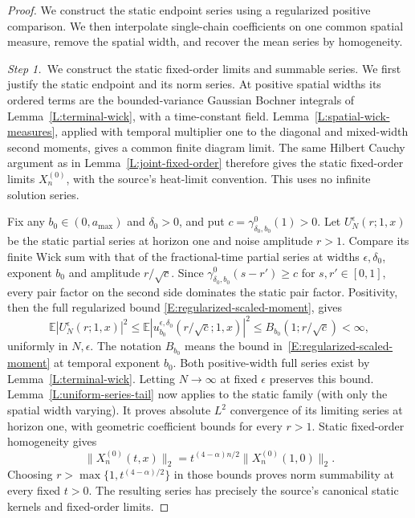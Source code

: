 \documentclass[12pt,oneside,openany]{book}
\numberwithin{equation}{section}
\theoremstyle{nogostyle}
\theoremstyle{definition}
\newcommand{\E}{\mathbb{E}}
\begin{document}
\begin{proof}
  We construct the static endpoint series using a regularized positive
  comparison. We then interpolate single-chain coefficients on one common
  spatial measure, remove the spatial width, and recover the mean series by
  homogeneity.


  \medskip
  \noindent\textit{Step 1.~}We construct the static fixed-order limits and
  summable series.
  We first justify the static endpoint and its norm series. At positive spatial
  widths its ordered terms are the bounded-variance Gaussian Bochner integrals
  of Lemma~\ref{L:terminal-wick}, with a time-constant field.
  Lemma~\ref{L:spatial-wick-measures}, applied with temporal multiplier one to
  the diagonal and mixed-width second moments, gives a common finite diagram
  limit. The same Hilbert Cauchy argument as in Lemma~\ref{L:joint-fixed-order}
  therefore gives the static fixed-order limits $X_n^{(0)}$, with the source's
  heat-limit convention. This uses no infinite solution series.

  Fix any $b_0 \in (0,a_{\max})$ and $\delta_0 > 0$, and put $c =
  \gamma_{\delta_0,b_0}^0(1) > 0$. Let $U_N^\epsilon(r;1,x)$ be the static
  partial series at horizon one and noise amplitude $r > 1$. Compare its finite
  Wick sum with that of the fractional-time partial series at widths
  $\epsilon,\delta_0$, exponent $b_0$ and amplitude $r/\sqrt c$. Since
  $\gamma_{\delta_0,b_0}^0(s-r') \ge c$ for $s,r' \in [0,1]$, every pair factor
  on the second side dominates the static pair factor. Positivity, then the full
  regularized bound \eqref{E:regularized-scaled-moment}, gives
  \[
    \E|U_N^\epsilon(r;1,x)|^2
    \le \E|u^{\epsilon,\delta_0}_{b_0}(r/\sqrt c;1,x)|^2
    \le B_{b_0}(1;r/\sqrt c)<\infty,
  \]
  uniformly in $N,\epsilon$. The notation $B_{b_0}$ means the bound
  in~\eqref{E:regularized-scaled-moment} at temporal exponent $b_0$. Both
  positive-width full series exist by Lemma~\ref{L:terminal-wick}. Letting $N
  \to \infty$ at fixed $\epsilon$ preserves this bound.
  Lemma~\ref{L:uniform-series-tail} now applies to the static family (with only
  the spatial width varying). It proves absolute $L^2$ convergence of its
  limiting series at horizon one, with geometric coefficient bounds for every $r
  > 1$. Static fixed-order homogeneity gives
  \[
    \|X_n^{(0)}(t,x)\|_2
    =t^{(4-\alpha)n/2}\|X_n^{(0)}(1,0)\|_2.
  \]
  Choosing $r > \max\{1,t^{(4-\alpha)/2}\}$ in those bounds proves norm
  summability at every fixed $t > 0$. The resulting series has precisely the
  source's canonical static kernels and fixed-order limits.




\end{proof}
\end{document}
